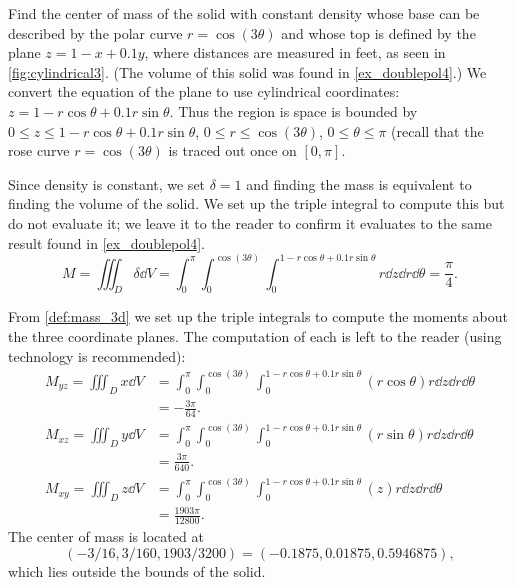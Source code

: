 \begin{example}\label{ex_cylindrical3}
Find
%
%
the center of mass of the solid with constant density whose base can be described by the polar curve $r=\cos(3\theta)$ and whose top is defined by the plane $z=1-x+0.1y$, where distances are measured in feet, as seen in \autoref{fig:cylindrical3}. (The volume of this solid was found in \autoref{ex_doublepol4}.)
\solution
We convert the equation of the plane to use cylindrical coordinates: $z= 1-r\cos\theta+0.1r\sin\theta$. Thus the region is space is bounded by $0 \leq z \leq 1-r\cos\theta + 0.1r\sin\theta$, $0 \leq r \leq \cos(3\theta)$, $0 \leq \theta \leq \pi$ (recall that the rose curve $r=\cos(3\theta)$ is traced out once on $[0,\pi]$.

Since density is constant, we set $\delta = 1$ and finding the mass is equivalent to finding the volume of the solid. We set up the triple integral to compute this but do not evaluate it; we leave it to the reader to confirm it evaluates to the same result found in \autoref{ex_doublepol4}.
\[
M = \iiint_D\delta \dd V = \int_0^{\pi}\int_0^{\cos(3\theta)}\int_0^{1-r\cos\theta+0.1r\sin\theta} r\dd z\dd r\dd\theta =\frac\pi4.%
\]

From \autoref{def:mass_3d} we set up the triple integrals to compute the moments about the three coordinate planes. The computation of each is left to the reader (using technology is recommended):
\begin{align*}
M_{yz} = \iiint_D x\dd V &= \int_0^{\pi}\int_0^{\cos(3\theta)}\int_0^{1-r\cos\theta+0.1r\sin\theta} (r\cos\theta) r\dd z\dd r\dd\theta\\
&= -\frac{3\pi}{64}. %
\\
M_{xz} = \iiint_D y\dd V &= \int_0^{\pi}\int_0^{\cos(3\theta)}\int_0^{1-r\cos\theta+0.1r\sin\theta} (r\sin\theta) r\dd z\dd r\dd\theta\\
&= \frac{3\pi}{640}. %
\\
M_{xy} = \iiint_D z\dd V &= \int_0^{\pi}\int_0^{\cos(3\theta)}\int_0^{1-r\cos\theta+0.1r\sin\theta} (z) r\dd z\dd r\dd\theta\\
 &= \frac{1903\pi}{12800}. %
\end{align*}
The center of mass %
is located at
\[(-3/16, 3/160, 1903/3200)=(-0.1875,0.01875,0.5946875),\]
which lies outside the bounds of the solid.
\end{example}

